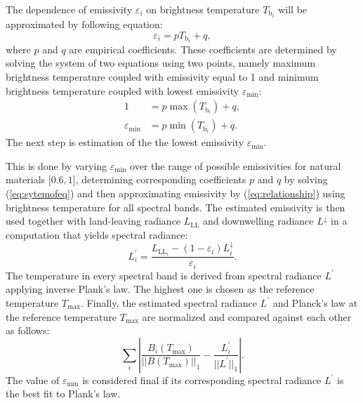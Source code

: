 The dependence of emissivity $ {\varepsilon_i}$ on brightness temperature $ {T_{\mathrm{b}_i}}$ will be approximated by following equation:
\begin{equation} \varepsilon_{ {i}} =  {p} T_{\mathrm{b}_{ {i}}} +  {q}, \label{eq:relationship}\end{equation}
where $ {p}$ and $ {q}$ are empirical coefficients. These coefficients are determined by solving the system of two equations using two points, namely maximum brightness temperature coupled with emissivity equal to 1 and minimum brightness temperature coupled with lowest emissivity $\varepsilon_\mathrm{min}$:
\begin{equation}
\begin{aligned}
	1 &=  {p} \max (T_{\mathrm{b}_{ {i}}}) +  {q}, \\
	\varepsilon_\mathrm{min} &=  {p} \min (T_{\mathrm{b}_{ {i}}}) +  {q}.
\end{aligned}
\label{eq:sytemofeq}
\end{equation}
The next step is estimation of the the lowest emissivity $\varepsilon_\mathrm{min}$.

This is done by varying $\varepsilon_\mathrm{min}$ over the range  {of possible emissivities for natural materials $[0.6,1{ {]}}$}, determining corresponding coefficients $ {p}$ and $ {q}$ by solving (\ref{eq:sytemofeq}) and then approximating emissivity by (\ref{eq:relationship}) using brightness temperature for all spectral bands. The estimated emissivity is then used together with land-leaving radiance $L_\mathrm{LL}$ and downwelling radiance $L^\downarrow$ in a computation that yields spectral radiance:
\begin{equation}
	L^{\prime}_{ {i}} = \frac{L_{\mathrm{LL}_{ {i}}}-(1-\varepsilon_{ {i}})L^\downarrow_{ {i}}}{\varepsilon_{ {i}}}.
	\label{eq:lprime}
\end{equation}
The temperature in every spectral band is derived from spectral radiance $L^{\prime}$ applying inverse Plank's law. The highest one is chosen as the reference temperature $T_\mathrm{max}$. Finally, the estimated spectral radiance $L^{\prime}$ and Planck's law at the reference temperature $T_\mathrm{max}$ are normalized and compared against each other as follows:
\begin{equation*}
	\sum_{ {i}} \left| \frac{B_{ {i}}(T_\mathrm{max})}{||B(T_\mathrm{max})||_1} - \frac{L^\prime_{ {i}}}{||L^\prime||_1} \right|.
\end{equation*}
The value of $\varepsilon_\mathrm{min}$ is considered final if its corresponding spectral radiance $L^{\prime}$  {is the best fit to Plank's law}.

